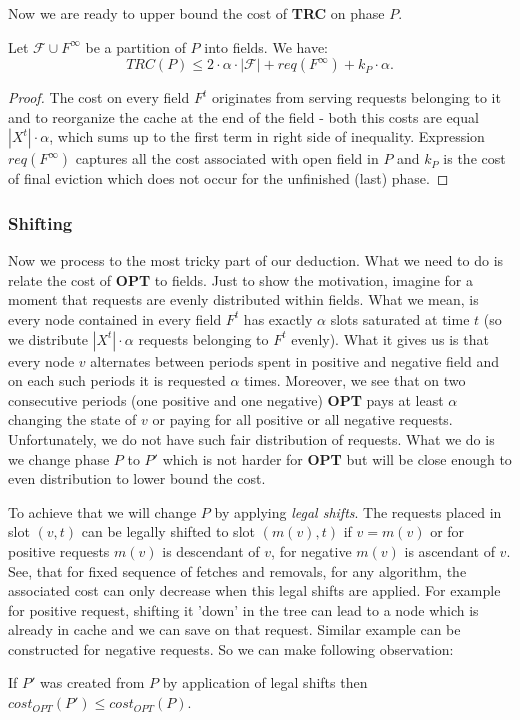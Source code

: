 Now we are ready to upper bound the cost of \textbf{TRC} on phase $P$.
\begin{lemma}
Let $\mathcal{F} \cup F^{\infty}$ be a partition of $P$ into fields. We have:
$$TRC(P) \leq 2 \cdot \alpha \cdot |\mathcal{F}| + req(F^{\infty}) + k_P \cdot 
\alpha.$$ 
\end{lemma}
\begin{proof}
The cost on every field $F^t$ originates from serving requests belonging to it 
and to reorganize the cache at the end of the field - both this costs are equal 
$|X^t| \cdot \alpha$, which sums up to the first term in right side of 
inequality. Expression $req(F^{\infty})$ captures all the cost associated with 
open field in $P$ and $k_P$ is the cost of final eviction which does not 
occur for the unfinished (last) phase. 
\end{proof}

\subsubsection{Shifting}
Now we process to the most tricky part of our deduction. What we need to do is 
relate the cost of \textbf{OPT} to fields. Just to show the motivation, imagine 
for a moment that requests are evenly distributed within fields. What we mean, 
is every node contained in every field $F^t$ has exactly $\alpha$ slots 
saturated at time $t$ (so we distribute $|X^t| \cdot \alpha$ requests belonging 
to $F^t$ evenly). What it gives us is that every node $v$ alternates between 
periods spent in positive and negative field and on each such periods it is 
requested $\alpha$ times. Moreover, we see that on two consecutive periods 
(one positive and one negative) \textbf{OPT} pays at least $\alpha$ changing 
the state of $v$ or paying for all positive or all negative requests. 
Unfortunately, we do not have such fair distribution of requests. What we do is 
we change phase $P$ to $P'$ which is not harder for \textbf{OPT} but will be 
close enough to even distribution to lower bound the cost.

To achieve that we will change $P$ by applying \textit{legal shifts}. The 
requests placed in slot $(v, t)$ can be legally shifted to slot $(m(v), t)$ if 
$v = m(v)$ or for positive requests $m(v)$ is descendant of $v$, for negative 
$m(v)$ is ascendant of $v$. See, that for fixed sequence of fetches and 
removals, for any algorithm, the associated cost can only decrease when this 
legal shifts are applied. For example for positive request, shifting it 'down' 
in the tree can lead to a node which is already in cache and we can save on 
that request. Similar example can be constructed for negative requests. So we 
can make following observation:
\begin{observe}
 If $P'$ was created from $P$ by application of  legal shifts then 
$cost_{OPT}(P') \leq cost_{OPT}(P)$.
\end{observe}

